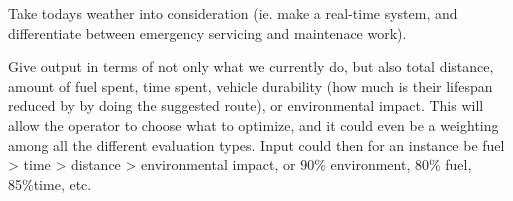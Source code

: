 Take todays weather into consideration (ie. make a real-time system, and differentiate between emergency servicing and maintenace work).

Give output in terms of not only what we currently do, but also total distance, amount of fuel spent, time spent, vehicle durability (how much is their lifespan reduced by by doing the suggested route), or environmental impact. This will allow the operator to choose what to optimize, and it could even be a weighting among all the different evaluation types. Input could then for an instance be fuel > time > distance > environmental impact, or 90\% environment, 80\% fuel, 85\%time, etc.

\cleardoublepage
